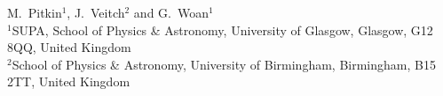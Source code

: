 M.~Pitkin$^1$, J.~Veitch$^2$ and G.~Woan$^1$ \\
$^1$SUPA, School of Physics \& Astronomy, University of Glasgow, Glasgow, G12 8QQ, United Kingdom \\
$^2$School of Physics \& Astronomy, University of Birmingham, Birmingham, B15 2TT,
United Kingdom
